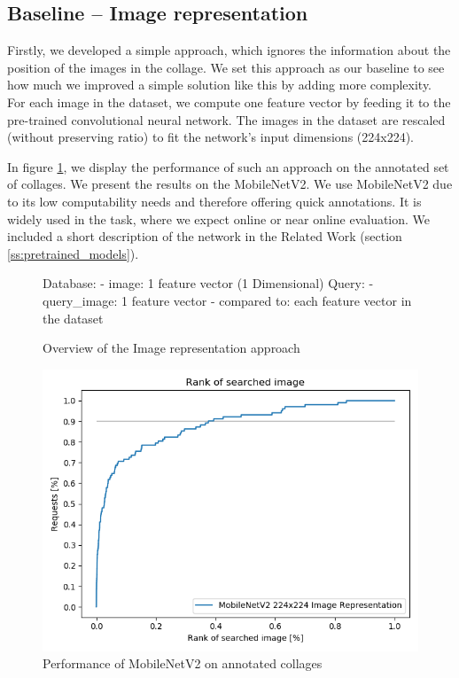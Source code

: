 \subsection{Baseline -- Image representation}

Firstly, we developed a simple approach, which ignores the information about the position of the images in the collage. We set this approach as our baseline to see how much we improved a simple solution like this by adding more complexity. For each image in the dataset, we compute one feature vector by feeding it to the pre-trained convolutional neural network. The images in the dataset are rescaled (without preserving ratio) to fit the network's input dimensions (224x224).

In figure \ref{fig:mobilenet_whole_image}, we display the performance of such an approach on the annotated set of collages. We present the results on the MobileNetV2. We use MobileNetV2 due to its low computability needs and therefore offering quick annotations. It is widely used in the task, where we expect online or near online evaluation. We included a short description of the network in the Related Work (section \ref{ss:pretrained_models}).

\begin{figure}
\centering
\begin{boxedverbatim}
Database:
    - image: 1 feature vector (1 Dimensional)
Query:
    - query_image: 1 feature vector
    - compared to: each feature vector in the dataset
\end{boxedverbatim}
\caption{Overview of the Image representation approach}
\end{figure}

\begin{figure}
    \centering
    \includegraphics[width=0.8\linewidth]{img/mobilenet_whole_image.png}
    \caption{Performance of MobileNetV2 on annotated collages}
    \label{fig:mobilenet_whole_image}
\end{figure}


